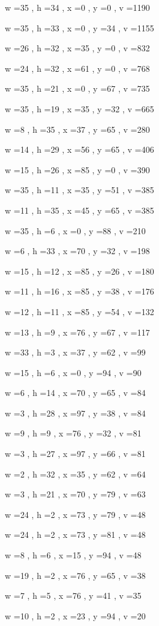 \documentclass[11pt]{article}
\begin{document}
w =35 , h =34 , x =0 , y =0 , v =1190
\par
w =35 , h =33 , x =0 , y =34 , v =1155
\par
w =26 , h =32 , x =35 , y =0 , v =832
\par
w =24 , h =32 , x =61 , y =0 , v =768
\par
w =35 , h =21 , x =0 , y =67 , v =735
\par
w =35 , h =19 , x =35 , y =32 , v =665
\par
w =8 , h =35 , x =37 , y =65 , v =280
\par
w =14 , h =29 , x =56 , y =65 , v =406
\par
w =15 , h =26 , x =85 , y =0 , v =390
\par
w =35 , h =11 , x =35 , y =51 , v =385
\par
w =11 , h =35 , x =45 , y =65 , v =385
\par
w =35 , h =6 , x =0 , y =88 , v =210
\par
w =6 , h =33 , x =70 , y =32 , v =198
\par
w =15 , h =12 , x =85 , y =26 , v =180
\par
w =11 , h =16 , x =85 , y =38 , v =176
\par
w =12 , h =11 , x =85 , y =54 , v =132
\par
w =13 , h =9 , x =76 , y =67 , v =117
\par
w =33 , h =3 , x =37 , y =62 , v =99
\par
w =15 , h =6 , x =0 , y =94 , v =90
\par
w =6 , h =14 , x =70 , y =65 , v =84
\par
w =3 , h =28 , x =97 , y =38 , v =84
\par
w =9 , h =9 , x =76 , y =32 , v =81
\par
w =3 , h =27 , x =97 , y =66 , v =81
\par
w =2 , h =32 , x =35 , y =62 , v =64
\par
w =3 , h =21 , x =70 , y =79 , v =63
\par
w =24 , h =2 , x =73 , y =79 , v =48
\par
w =24 , h =2 , x =73 , y =81 , v =48
\par
w =8 , h =6 , x =15 , y =94 , v =48
\par
w =19 , h =2 , x =76 , y =65 , v =38
\par
w =7 , h =5 , x =76 , y =41 , v =35
\par
w =10 , h =2 , x =23 , y =94 , v =20
\par
\newpage
\end{document}
